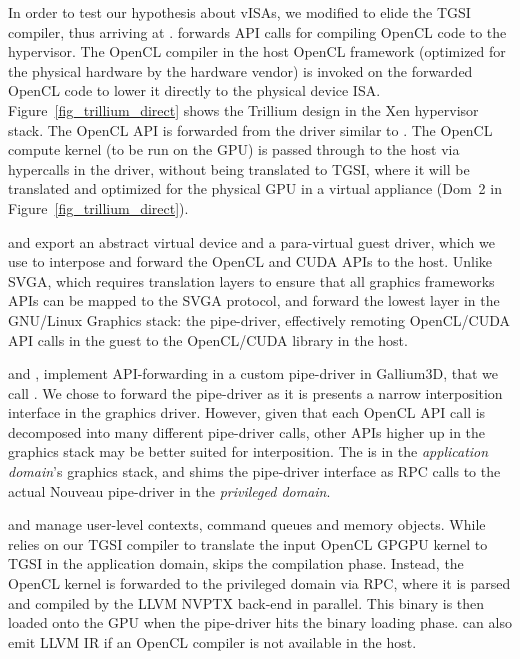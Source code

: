 In order to test our hypothesis about vISAs, we modified \XenSVGA to elide the
TGSI compiler, thus arriving at \Trillium. \Trillium forwards API calls for
compiling OpenCL code to the hypervisor. The OpenCL compiler in the host
OpenCL framework (optimized for the physical hardware by the hardware vendor)
is invoked on the forwarded OpenCL code to lower it directly to the physical
device ISA. Figure~\ref{fig_trillium_direct} shows the Trillium design in the
Xen hypervisor stack. The OpenCL API is forwarded from the driver similar to
\XenSVGA. The OpenCL compute kernel (to be run on the GPU) is passed through to
the host via hypercalls in the driver, without being translated to TGSI, where
it will be translated and optimized for the physical GPU in a virtual
appliance (Dom~2 in Figure~\ref{fig_trillium_direct}).

\XenSVGA and \Trillium export an abstract virtual device and a para-virtual
guest driver, which we use to interpose and forward the OpenCL and CUDA APIs
to the host. Unlike SVGA, which requires translation layers to ensure that all
graphics frameworks APIs can be mapped to the SVGA protocol, \XenSVGA and
\Trillium forward the lowest layer in the GNU/Linux Graphics stack: the
pipe-driver, effectively remoting OpenCL/CUDA API calls in the guest to the
OpenCL/CUDA library in the host.

\XenSVGA and \Trillium, implement API-forwarding in a custom pipe-driver in
Gallium3D, that we call \shadowpipe. We chose to forward the pipe-driver as it
is presents a narrow interposition interface in the graphics driver. However,
given that each OpenCL API call is decomposed into many different pipe-driver
calls, other APIs higher up in the graphics stack may be better suited for
interposition. The \shadowpipe is in the \textit{application domain}'s graphics
stack, and shims the pipe-driver interface as RPC calls to the actual Nouveau
pipe-driver in the \textit{privileged domain}.

\XenSVGA and \Trillium manage user-level contexts, command queues and memory
objects. While \XenSVGA relies on our TGSI compiler to translate the input
OpenCL GPGPU kernel to TGSI in the application domain, \Trillium skips the
compilation phase. Instead, the OpenCL kernel is forwarded to the privileged
domain via RPC, where it is parsed and compiled by the LLVM NVPTX back-end in
parallel. This binary is then loaded onto the GPU when the pipe-driver hits
the binary loading phase. \Trillium can also emit LLVM IR if an OpenCL
compiler is not available in the host.

